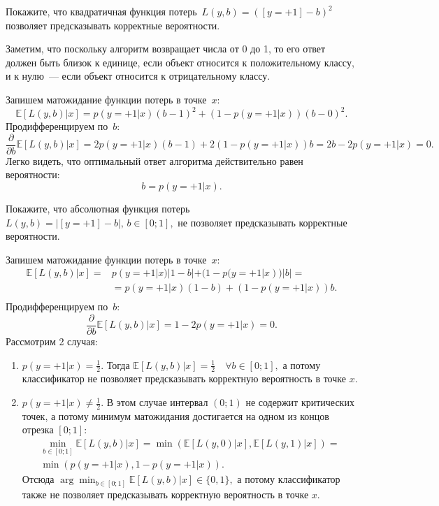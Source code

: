 \documentclass[12pt,a4paper]{article}
\begin{document}
\begin{vkProblem}
	Покажите, что квадратичная функция потерь~$L(y, b) = ([y = +1] - b)^2$
	позволяет предсказывать корректные вероятности.
\end{vkProblem}


\begin{esSolution}
	Заметим, что поскольку алгоритм возвращает числа от 0 до 1,
	то его ответ должен быть близок к единице, если объект относится
	к положительному классу, и к нулю~--- если объект относится
	к отрицательному классу.
	
	Запишем матожидание функции потерь в точке~$x$:
	$$\mathbb{E} \left[ L(y, b)|x\right] = p(y=+1|x)(b-1)^2 + (1 - p(y=+1|x))(b-0)^2.$$
	Продифференцируем по~$b$:
	$$\frac{\partial}{\partial b}
	\mathbb{E} \left[
	L(y, b)
	|
	x
	\right] =
	2 p(y = +1 | x) (b - 1)
	+
	2 (1 - p(y = +1 | x)) b
	=
	2b - 2p(y = +1 | x)
	=
	0.$$
	Легко видеть, что оптимальный ответ алгоритма действительно
	равен вероятности:
	$$b = p(y = +1 | x).$$
\end{esSolution}

\begin{vkProblem} Покажите, что абсолютная функция потерь~$L(y, b) = |[y = +1] - b|, \, b \in [0; 1],$
	не позволяет предсказывать корректные вероятности.
\end{vkProblem}
\begin{esSolution}
	Запишем матожидание функции потерь в точке~$x$:
	\begin{align*}
		\mathbb{E} \left[ L(y, b)|x\right] = &p(y=+1|x)|1-b| + (1 - p(y=+1|x))|b| = \\
		&= p(y=+1|x)(1-b)+ (1 - p(y=+1|x))b.\\
	\end{align*}
	Продифференцируем по~$b$:
	$$\frac{\partial}{\partial b}
	\mathbb{E} \left[
	L(y, b)
	|
	x
	\right] =
	1 - 2 p(y = +1 | x) = 0.$$
	Рассмотрим 2 случая:
	\begin{enumerate}
		\item $p(y=+1|x) = \frac{1}{2}.$ Тогда $\mathbb{E} \left[ L(y, b)|x\right] = \frac{1}{2} \quad \forall b \in [0; 1],$ а потому классификатор не позволяет предсказывать корректную вероятность в точке $x$.
		\item $p(y=+1|x) \ne \frac{1}{2}.$ В этом случае интервал $(0; 1)$ не содержит критических точек, а потому минимум матожидания достигается на одном из концов отрезка $[0; 1]:$
		\begin{align*}
			\min_{b \in [0;1]} \mathbb{E} \left[ L(y, b)|x\right] = 
			\min \left(\mathbb{E} \left[ L(y, 0)|x\right], \mathbb{E} \left[ L(y, 1)|x\right] \right) =\\
			\min \left(p(y = +1 | x), 1 - p(y = +1 | x)\right).
		\end{align*}
		Отсюда $\arg \min_{b \in [0;1]} \mathbb{E} \left[ L(y, b)|x\right] \in \{0, 1\},$ а потому классификатор также не позволяет предсказывать корректную вероятность в точке $x$.
	\end{enumerate}
\end{esSolution}
\end{document}
